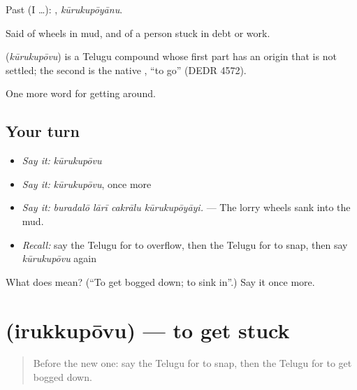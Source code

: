 Past (I …): , \emph{kūrukupōyānu}.

Said of wheels in mud, and of a person stuck in debt or work.

\begin{cousinweb}
\textbf{} (\emph{kūrukupōvu}) is a Telugu compound whose first part has an origin that is not settled; the second is the native , \textquotedblleft{}to go\textquotedblright{} (DEDR 4572).
\end{cousinweb}

\begin{grammarlens}[title={What you've built}]
One more word for getting around.
\end{grammarlens}

\subsection*{Your turn}
\begin{itemize}
\raggedright
  \item \emph{Say it:} \emph{kūrukupōvu}
  \item \emph{Say it:} \emph{kūrukupōvu}, once more
  \item \emph{Say it:} \emph{buradalō lārī cakrālu kūrukupōyāyi.} — The lorry wheels sank into the mud.
  \item \emph{Recall:} say the Telugu for to overflow, then the Telugu for to snap, then say \emph{kūrukupōvu} again
\end{itemize}

\begin{tcolorbox}[breakable,colback=teal!4,colframe=teal!35!black,title={Before you move on}]
What does  mean? (\textquotedblleft{}To get bogged down; to sink in\textquotedblright{}.) Say it once more.
\end{tcolorbox}
\section[\texorpdfstring{\te{ఇరుక్కుపోవు} (irukkupōvu)}{ఇరుక్కుపోవు (irukkupōvu)}]{ (irukkupōvu) — to get stuck}

\label{lesson:TE-C480-irukkupovu}



\begin{quote}
Before the new one: say the Telugu for to snap, then the Telugu for to get bogged down.
\end{quote}

